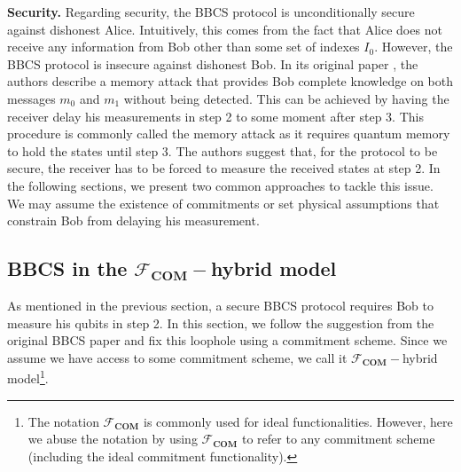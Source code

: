 \noindent\textbf{Security.} Regarding security, the BBCS protocol is unconditionally secure against dishonest Alice. Intuitively, this comes from the fact that Alice does not receive any information from Bob other than some set of indexes $I_0$. However, the BBCS protocol is insecure against dishonest Bob. In its original paper \cite{BBCS92}, the authors describe a memory attack that provides Bob complete knowledge on both messages $m_0$ and $m_1$ without being detected. This can be achieved by having the receiver delay his measurements in step 2 to some moment after step 3. This procedure is commonly called the memory attack as it requires quantum memory to hold the states until step 3. The authors suggest that, for the protocol to be secure, the receiver has to be forced to measure the received states at step 2. In the following sections, we present two common approaches to tackle this issue. We may assume the existence of commitments or set physical assumptions that constrain Bob from delaying his measurement.


\subsection{BBCS in the $\mathcal{F}_{\textbf{COM}}-$hybrid model}\label{BBCS-com-hybrid}

As mentioned in the previous section, a secure BBCS protocol requires Bob to measure his qubits in step 2. In this section, we follow the suggestion from the original BBCS paper \cite{BBCS92} and fix this loophole using a commitment scheme. Since we assume we have access to some commitment scheme, we call it $\mathcal{F}_{\textbf{COM}}-$hybrid model\footnote{The notation $\mathcal{F}_{\textbf{COM}}$ is commonly used for ideal functionalities. However, here we abuse the notation by using $\mathcal{F}_{\textbf{COM}}$ to refer to any commitment scheme (including the ideal commitment functionality).}.

